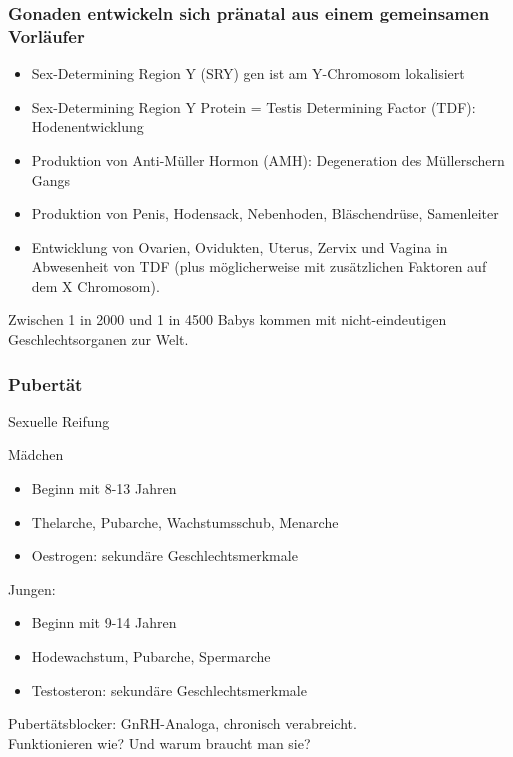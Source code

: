 \documentclass{beamer}
\begin{document}
\begin{frame}
\frametitle{Gonaden entwickeln sich pränatal aus einem gemeinsamen Vorläufer}


\begin{itemize}
    \item 
 Sex-Determining Region Y (SRY) gen ist am Y-Chromosom lokalisiert
    
 \item
 Sex-Determining Region Y Protein = Testis Determining Factor (TDF): Hodenentwicklung
  
 \item
Produktion von Anti-Müller Hormon (AMH): Degeneration des Müllerschern Gangs
 
 \item
Produktion  von Penis, Hodensack, Nebenhoden, Bläschendrüse, Samenleiter
 
 \item
Entwicklung von Ovarien, Ovidukten, Uterus, Zervix und Vagina in Abwesenheit von TDF (plus möglicherweise mit zusätzlichen Faktoren auf dem X Chromosom). 

\end{itemize}

 
Zwischen 1 in 2000 und 1 in 4500 Babys kommen mit nicht-eindeutigen Geschlechtsorganen zur Welt. 

\end{frame}




\begin{frame}

\frametitle{Pubertät}
Sexuelle Reifung

\begin{block}{Mädchen}
\begin{itemize}
\item
Beginn mit 8-13 Jahren
\item
Thelarche, Pubarche, Wachstumsschub, Menarche
\item
Oestrogen: sekundäre Geschlechtsmerkmale
\end{itemize}
\end{block} 

 

\begin{block}{Jungen:}
\begin{itemize}
\item
Beginn mit 9-14 Jahren
\item    
Hodewachstum, Pubarche, Spermarche
\item
Testosteron: sekundäre Geschlechtsmerkmale
\end{itemize}
\end{block}

 

Pubertätsblocker: GnRH-Analoga, chronisch verabreicht. \\
\textcolor{theme}{Funktionieren wie? Und warum braucht man sie?}

\end{frame}
\end{document}
